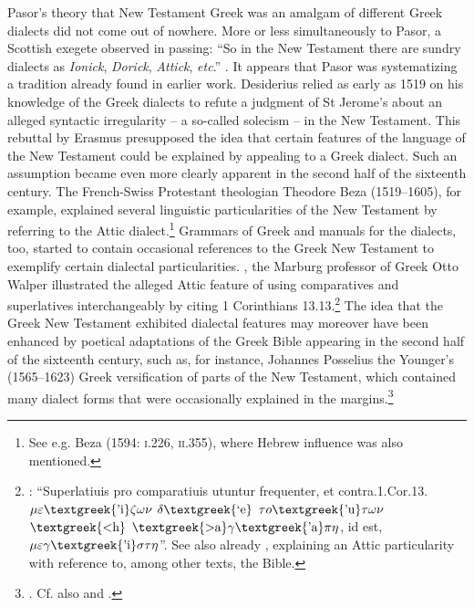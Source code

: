 Pasor’s theory that New Testament Greek was an amalgam of different Greek dialects did not come out of nowhere. More or less simultaneously to Pasor, a Scottish exegete observed in passing: “So in the New Testament there are sundry dialects as \textit{Ionick}, \textit{Dorick}, \textit{Attick}, \textit{etc}.” \citep[102]{Weemes1632}. It appears that Pasor was systematizing a tradition already found in earlier work. Desiderius \citet[270]{Erasmus1519} relied as early as 1519 on his knowledge of the Greek dialects to refute a judgment of St Jerome’s about an alleged syntactic irregularity – a so-called solecism – in the New Testament. This rebuttal by Erasmus presupposed the idea that certain features of the language of the New Testament could be explained by appealing to a Greek dialect. Such an assumption became even more clearly apparent in the second half of the sixteenth century. The French-Swiss Protestant theologian Theodore Beza (1519–1605), for example, explained several linguistic particularities of the New Testament by referring to the Attic dialect.\footnote{See e.g. Beza (1594: \textsc{i.}226, \textsc{ii}.355), where Hebrew influence was also mentioned.} Grammars of Greek and manuals for the dialects, too, started to contain occasional references to the Greek New Testament to exemplify certain dialectal particularities. \citealt{In1589}, the Marburg professor of Greek Otto Walper illustrated the alleged Attic feature of using comparatives and superlatives interchangeably by citing 1 Corinthians 13.13.\footnote{\citet[32]{Walper1589}: “Superlatiuis pro comparatiuis utuntur frequenter, et contra.1.Cor.13. $\mu \varepsilon \text{\textgreek{'i}}\zeta \omega \nu $ $\delta \text{\textgreek{`e}}$ $\tau o\text{\textgreek{'u}}\tau \omega \nu $ $\text{\textgreek{<h}}$ $\text{\textgreek{>a}}\gamma \text{\textgreek{'a}}\pi \eta $, id est, $\mu \varepsilon \gamma \text{\textgreek{'i}}\sigma \tau \eta $”. See also already \citet[251]{Ruland1556}, explaining an Attic particularity with reference to, among other texts, the Bible.} The idea that the Greek New Testament exhibited dialectal features may moreover have been enhanced by poetical adaptations of the Greek Bible appearing in the second half of the sixteenth century, such as, for instance, Johannes Posselius the Younger’s (1565–1623) Greek versification of parts of the New Testament, which contained many dialect forms that were occasionally explained in the margins.\footnote{\citet{Posselius1599}. Cf. also \citet{Jamot1593} and \citet{Keimann1649}.}

